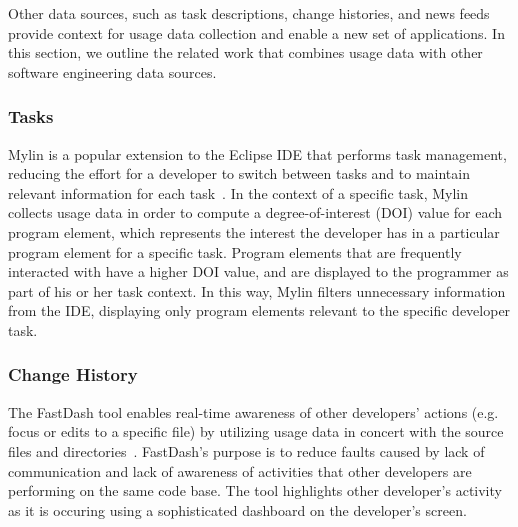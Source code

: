 
Other data sources, such as task descriptions, change histories, and
news feeds provide context for usage data collection and enable a new
set of applications. In this section, we outline the related work that
combines usage data with other software engineering data sources.

\subsubsection{Tasks}

Mylin is a popular extension to the Eclipse IDE that performs task
management, reducing the effort for a developer to switch between
tasks and to maintain relevant information for each
task~\cite{Kersten-Mylin}. In the context of a specific task, Mylin
collects usage data in order to compute a degree-of-interest (DOI)
value for each program element, which represents the interest the
developer has in a particular program element for a specific
task. Program elements that are frequently interacted with have a
higher DOI value, and are displayed to the programmer as part of his
or her task context.  In this way, Mylin filters unnecessary
information from the IDE, displaying only program elements relevant to
the specific developer task.


\subsubsection{Change History}


The FastDash tool enables real-time awareness of other developers'
actions (e.g. focus or edits to a specific file) by utilizing usage
data in concert with the source files and
directories~\cite{FastDash}. FastDash's purpose is to reduce faults
caused by lack of communication and lack of awareness of activities
that other developers are performing on the same code base. The tool
highlights other developer's activity as it is occuring using a
sophisticated dashboard on the developer's screen.

